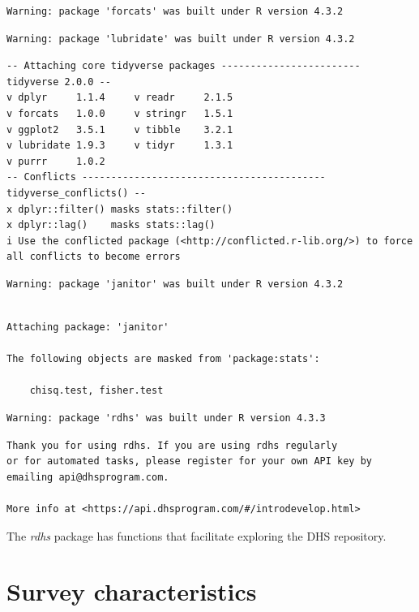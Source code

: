 \documentclass[
  letterpaper,
  DIV=11,
  numbers=noendperiod]{scrreprt}
\begin{document}
\begin{verbatim}
Warning: package 'forcats' was built under R version 4.3.2
\end{verbatim}

\begin{verbatim}
Warning: package 'lubridate' was built under R version 4.3.2
\end{verbatim}

\begin{verbatim}
-- Attaching core tidyverse packages ------------------------ tidyverse 2.0.0 --
v dplyr     1.1.4     v readr     2.1.5
v forcats   1.0.0     v stringr   1.5.1
v ggplot2   3.5.1     v tibble    3.2.1
v lubridate 1.9.3     v tidyr     1.3.1
v purrr     1.0.2     
-- Conflicts ------------------------------------------ tidyverse_conflicts() --
x dplyr::filter() masks stats::filter()
x dplyr::lag()    masks stats::lag()
i Use the conflicted package (<http://conflicted.r-lib.org/>) to force all conflicts to become errors
\end{verbatim}

\begin{verbatim}
Warning: package 'janitor' was built under R version 4.3.2
\end{verbatim}

\begin{verbatim}

Attaching package: 'janitor'

The following objects are masked from 'package:stats':

    chisq.test, fisher.test
\end{verbatim}

\begin{verbatim}
Warning: package 'rdhs' was built under R version 4.3.3
\end{verbatim}

\begin{verbatim}
Thank you for using rdhs. If you are using rdhs regularly
or for automated tasks, please register for your own API key by
emailing api@dhsprogram.com. 

More info at <https://api.dhsprogram.com/#/introdevelop.html>
\end{verbatim}

The \emph{rdhs} package has functions that facilitate exploring the DHS
repository.

\hypertarget{survey-characteristics}{%
\section{\texorpdfstring{\textbf{Survey
characteristics}}{Survey characteristics}}\label{survey-characteristics}}
\end{document}
